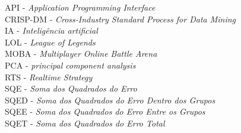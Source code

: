API - \textit{Application Programming Interface}\\
CRISP-DM - \textit{Cross-Industry Standard Process for Data Mining}\\
IA -  \textit{Inteligência artificial}\\
LOL - \textit{League of Legends}\\
MOBA - \textit{Multiplayer Online Battle Arena}\\
PCA - \textit{principal component analysis}\\
RTS - \textit{Realtime Strategy }\\
SQE - \textit{Soma dos Quadrados do Erro}\\
SQED - \textit{Soma dos Quadrados do Erro Dentro dos Grupos}\\
SQEE - \textit{Soma dos Quadrados do Erro Entre os Grupos}\\
SQET - \textit{Soma dos Quadrados do Erro Total}\\
